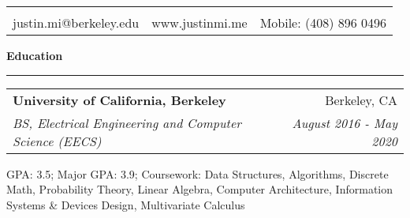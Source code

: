 \documentclass[11pt,letterpaper]{article}
\makeatletter
\newenvironment{topic}[1]
    {
    {\Large \centerline{#1}}
    \vspace*{0.03in}
    \hrule 
    \vspace*{0.05in}
    }
    {}
\newenvironment{event}
    {
    \begin{tabular*}{\textwidth}{l@{\extracolsep{\fill}}r}
    }
    {
    \end{tabular*}
    }
\newenvironment{detail}
    {
    \normalsize
    }
    {
    \vspace*{0.02in}
    }
\newenvironment{head}
    {
    \begin{center}
    \begin{tabular*}{\textwidth}{@{\extracolsep{\fill}} l c r}
    }
    {
    \hline
    \hline
    \end{tabular*}
    \end{center}
    }
\makeatother
\begin{document}
    \begin{head}
                           & \huge{\textbf{\sc{\textbf{Justin Mi}}}} \\
    justin.mi@berkeley.edu  & www.justinmi.me & Mobile: (408) 896 0496 \\
    \end{head}





    \begin{topic}{\textbf{Education}}
        \begin{event}
            \textbf{University of California, Berkeley} & Berkeley, CA \\
            \emph{BS, Electrical Engineering and Computer Science (EECS)} & \emph{August 2016 - May 2020}        
        \end{event}
            \begin{detail}
                GPA: 3.5; Major GPA: 3.9; Coursework: Data Structures, Algorithms, Discrete Math, Probability Theory, Linear Algebra, Computer Architecture, Information Systems \& Devices Design, Multivariate Calculus            
            \end{detail}
    \end{topic} \vspace*{0.1in}
\end{document}
